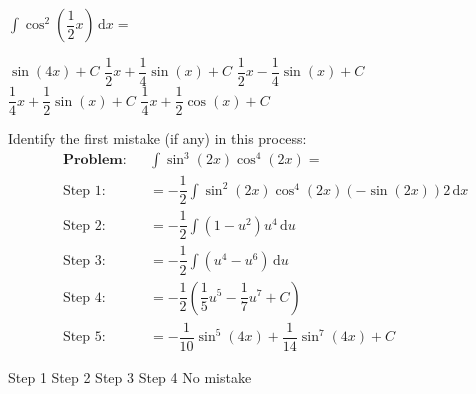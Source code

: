 \begin{questions}
    \question $\int \cos^2 \left(\dfrac{1}{2}x\right) \,\mathrm{d}x = $ \\

    \begin{oneparchoices}
        \choice $\sin (4x) + C$
        \choice $\dfrac{1}{2}x + \dfrac{1}{4}\sin (x) + C$
        \choice $\dfrac{1}{2}x - \dfrac{1}{4}\sin (x) + C$ \\[11pt]
        \makebox[0.18\textwidth]\choice $\dfrac{1}{4}x + \dfrac{1}{2}\sin (x) + C$
        \makebox[0.22\textwidth] \choice $\dfrac{1}{4}x + \dfrac{1}{2}\cos (x) + C$
    \end{oneparchoices} \par \horizontalline

    \question Identify the first mistake (if any) in this process: \begin{align*}
        & \textbf{Problem:} && \int \sin^3 (2x)\cos^4 (2x) = \\[11pt]
        & \text{Step 1:} && = -\dfrac{1}{2}\int \sin^2 (2x)\cos^4 (2x)(-\sin (2x))2 \,\mathrm{d}x \\[5.5pt]
        & \text{Step 2:} && = -\dfrac{1}{2}\int \left(1 - u^2\right)u^4 \,\mathrm{d}u \\[5.5pt]
        & \text{Step 3:} && = -\dfrac{1}{2}\int \left(u^4 - u^6\right) \,\mathrm{d}u \\[5.5pt]
        & \text{Step 4:} && = -\dfrac{1}{2}\left(\dfrac{1}{5}u^5 - \dfrac{1}{7}u^7 + C\right) \\[5.5pt]
        & \text{Step 5:} && = -\dfrac{1}{10}\sin^5 (4x) + \dfrac{1}{14}\sin^7 (4x) + C
    \end{align*}

    \begin{oneparchoices}
        \choice Step 1
        \choice Step 2
        \choice Step 3
        \choice Step 4
        \choice No mistake
    \end{oneparchoices} \par \horizontalline
\end{questions}
